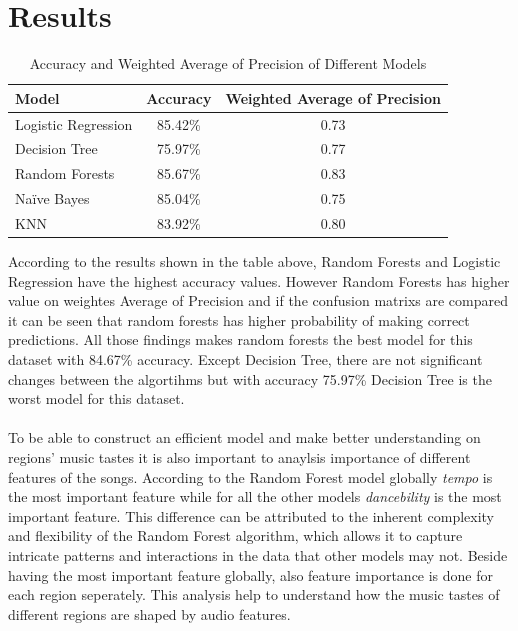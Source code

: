 

\chapter{Results}

\begin{table}[htbp]
    \centering
    \begin{tabular}{|l|c|c|}
    \hline
    \textbf{Model}           & \textbf{Accuracy} & \textbf{Weighted Average of Precision} \\ \hline
    Logistic Regression & 85.42\%          & 0.73                \\ \hline
    Decision Tree       & 75.97\%          & 0.77              \\ \hline
    Random Forests      & 85.67\%          & 0.83             \\ \hline
    Naïve Bayes         & 85.04\%          & 0.75               \\ \hline
    KNN                 & 83.92\%          & 0.80               \\ \hline
    \end{tabular}
    \caption{Accuracy and Weighted Average of Precision of Different Models}
    \end{table}
    
According to the results shown in the table above, Random Forests and Logistic Regression have the highest accuracy values. However Random Forests has 
higher value on weightes Average of Precision and if the confusion matrixs are compared it can be seen that random forests has higher 
probability of making correct predictions. All those findings makes random forests the best model for this dataset with 84.67\% accuracy. Except Decision Tree, there are not 
significant changes between the algortihms but with accuracy 75.97\% Decision Tree is the worst model for this dataset.
\\
\\
To be able to construct an efficient model and make better understanding on regions' music tastes it is also important to anaylsis importance of
different features of the songs. According to the Random Forest model globally \textit{tempo} is the most important feature while for all the other models 
\textit{dancebility} is the most important feature. This difference can be attributed to the inherent complexity and flexibility of the Random Forest
algorithm, which allows it to capture intricate patterns and interactions in the data that other models may not. Beside having the most important feature globally,
also feature importance is done for each region seperately. This analysis help to understand how the music tastes of different regions are shaped by audio features. 

